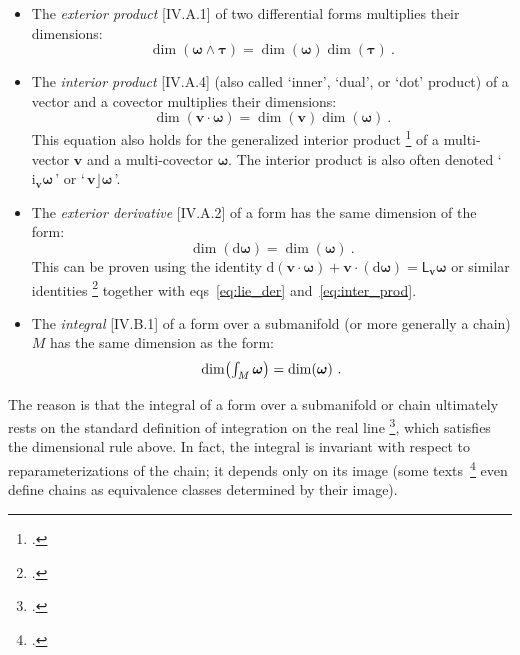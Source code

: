 \documentclass[\ifafour a4paper,12pt,\else a5paper,10pt,\fi%
onecolumn,oneside,article,%
british%
]{memoir}
\newcommand*{\defquote}[1]{`#1'}
\newcommand*{\mathquote}[1]{`\,#1\,'}
\theoremstyle{remark}
\theoremstyle{innote}
\newcommand*{\citep}{\footcites}
\newcommand*{\di}{\mathrm{d}}%
\renewcommand*{\|}[1][]{\nonscript\,#1\vert\nonscript\;\mathopen{}}
\newcommand*{\sect}{\S}%
\newcommand*{\sects}{\S\S}%
\newcommand*{\chap}{ch.}%
\newcommand*{\eqns}{eqs}%
\newcommand*{\eg}{{e.g.}}
\newcommand*{\tint}{\begingroup\textstyle\int\endgroup\nolimits}
\newcommand*{\Li}{\textsf{L}}
\newcommand*{\ii}{\mathbin{\!\cdot\!}}
\newcommand*{\yom}{\bm{\omega}}
\newcommand*{\yta}{\bm{\tau}}
\newcommand*{\yv}{\bm{v}}
\begin{document}
\begin{itemize}[wide=0pt]
\item The \emph{exterior product} [IV.A.1] of two differential forms
  multiplies their dimensions:
  \begin{equation}
  \dim(\yom\land\yta) = \dim(\yom)\dim(\yta) \ .\label{eq:ext_prod}
\end{equation}
  
\item The \emph{interior product} [IV.A.4] (also called \defquote{inner},
  \defquote{dual}, or \defquote{dot} product) of a vector and a covector
  multiplies their dimensions:
  \begin{equation}
    \dim(\yv\ii\yom) =\dim(\yv)\dim(\yom) \ .
    \label{eq:inter_prod}
\end{equation}
This equation also holds for the generalized interior product
\citep{deschamps1970}[Appendices]{deschamps1981}{lindell2004}[\sect~F.I.267]{truesdelletal1960}[Box
4.1, p. 92, item 4]{misneretal1970_r1973}[see also][]{portamana2019e} of a
multi-vector $\yv$ and a multi-covector $\yom$. The interior product is
also often denoted \mathquote{$\mathrm{i}_{\yv}\yom$} or
\mathquote{$\yv\mathbin{\!\rfloor\!}\yom$}.


\item The \emph{exterior derivative} [IV.A.2] of a form has the same
  dimension of the form:
  \begin{equation}
    \dim(\di\yom) =\dim(\yom) \ .
    \label{eq:ext_deriv}
  \end{equation}
  This can be proven using the identity
  $\di(\yv\ii\yom)+\yv\ii(\di\yom) = \Li_{\yv}\yom$ or similar identities
  \citep[\chap~9 p.~180 Theorem~9.78]{curtisetal1985}[\sect~6.4
  Theorem~6.4.8]{abrahametal1983_r1988} together with
  \eqns~\eqref{eq:lie_der} and~\eqref{eq:inter_prod}.

\item The \emph{integral} [IV.B.1] of a form over a submanifold (or more
  generally a chain) $M$ has the same dimension as the form:
  \begin{equation}
    \dim\bigl(\tint_{M}\yom\bigr) =\dim(\yom) \ .
    \label{eq:integration}
  \end{equation}
\end{itemize}
The reason is that the integral of a form over a submanifold or chain
ultimately rests on the standard definition of integration on the real line
\citep[\eg][\sects~IV.B.1--2]{choquetbruhatetal1977_r1996}[\sect~5 p.~21,
\sect~6
p.~24]{derham1955_t1984}[\sect~7.1]{abrahametal1983_r1988}[\sect~VI.2]{boothby1975_r2003},
which satisfies the dimensional rule above. In fact, the integral is
invariant with respect to reparameterizations of the chain; it depends only
on its image (some texts~\citep[\eg][\sect~10.4]{martin1991_r2004}[\sect~7.3]{fecko2006} even define chains as
equivalence classes determined by their image).
\end{document}
